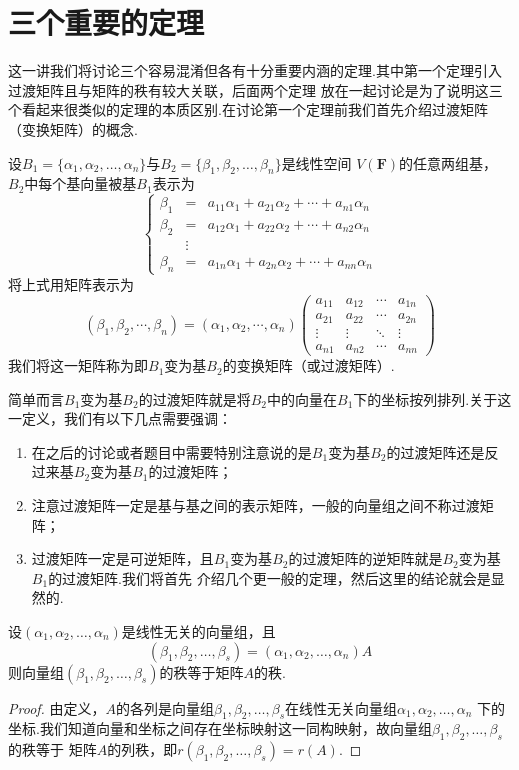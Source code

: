 \section{三个重要的定理}
这一讲我们将讨论三个容易混淆但各有十分重要内涵的定理.其中第一个定理引入过渡矩阵且与矩阵的秩有较大关联，后面两个定理
放在一起讨论是为了说明这三个看起来很类似的定理的本质区别.在讨论第一个定理前我们首先介绍过渡矩阵（变换矩阵）的概念.
\begin{definition}
    设$B_1=\{\alpha_1,\alpha_2,\ldots,\alpha_n\}$与$B_2=\{\beta_1,\beta_2,\ldots,\beta_n\}$是线性空间
    $V(\mathbf{F})$的任意两组基，$B_2$中每个基向量被基$B_1$表示为
    \[ \left\{
    \begin{array}{rcl}
        \beta_1&=&a_{11}\alpha_1+a_{21}\alpha_2+\cdots+a_{n1}\alpha_n \\
        \beta_2&=&a_{12}\alpha_1+a_{22}\alpha_2+\cdots+a_{n2}\alpha_n \\
        &\vdots& \\
        \beta_n&=&a_{1n}\alpha_1+a_{2n}\alpha_2+\cdots+a_{nn}\alpha_n
    \end{array}
    \right. \]
    将上式用矩阵表示为
    \[(\beta_1,\beta_2,\cdots,\beta_n)=(\alpha_1,\alpha_2,\cdots,\alpha_n)\begin{pmatrix}
        a_{11} & a_{12} & \cdots & a_{1n} \\
        a_{21} & a_{22} & \cdots & a_{2n} \\
        \vdots & \vdots & \ddots & \vdots \\
        a_{n1} & a_{n2} & \cdots & a_{nn}
    \end{pmatrix}\]
    我们将这一矩阵称为即$B_1$变为基$B_2$的变换矩阵（或过渡矩阵）.
\end{definition}
简单而言$B_1$变为基$B_2$的过渡矩阵就是将$B_2$中的向量在$B_1$下的坐标按列排列.关于这一定义，我们有以下几点需要强调：
\begin{enumerate}
    \item 在之后的讨论或者题目中需要特别注意说的是$B_1$变为基$B_2$的过渡矩阵还是反过来基$B_2$变为基$B_1$的过渡矩阵；
    \item 注意过渡矩阵一定是基与基之间的表示矩阵，一般的向量组之间不称过渡矩阵；
    \item 过渡矩阵一定是可逆矩阵，且$B_1$变为基$B_2$的过渡矩阵的逆矩阵就是$B_2$变为基$B_1$的过渡矩阵.我们将首先
    介绍几个更一般的定理，然后这里的结论就会是显然的.
\end{enumerate}
\begin{theorem}
    设$(\alpha_1,\alpha_2,\ldots,\alpha_n)$是线性无关的向量组，且
    \[(\beta_1,\beta_2,\ldots,\beta_s)=(\alpha_1,\alpha_2,\ldots,\alpha_n)A\]
    则向量组$(\beta_1,\beta_2,\ldots,\beta_s)$的秩等于矩阵$A$的秩.
\end{theorem}
\begin{proof}
    由定义，$A$的各列是向量组$\beta_1,\beta_2,\ldots,\beta_s$在线性无关向量组$\alpha_1,\alpha_2,\ldots,\alpha_n$
    下的坐标.我们知道向量和坐标之间存在坐标映射这一同构映射，故向量组$\beta_1,\beta_2,\ldots,\beta_s$的秩等于
    矩阵$A$的列秩，即$r(\beta_1,\beta_2,\ldots,\beta_s)=r(A)$.
\end{proof}

